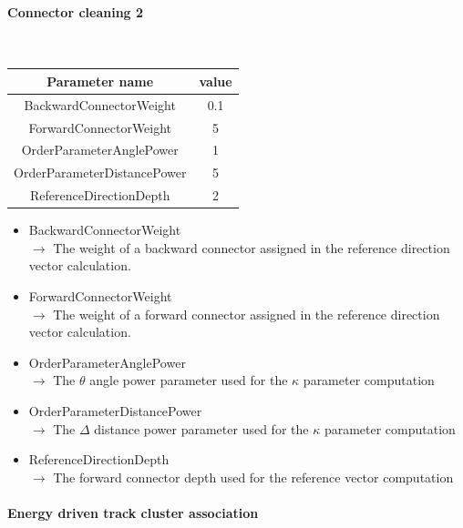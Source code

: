 \documentclass[cits]{JINST}
\begin{document}
\paragraph{Connector cleaning 2} ~

\begin{table}[!ht]
  \begin{center}
    \begin{tabu} to \linewidth { c | c } 
          Parameter name & value \\
          \hline
          BackwardConnectorWeight & 0.1 \\
          ForwardConnectorWeight & 5 \\
          OrderParameterAnglePower & 1 \\
          OrderParameterDistancePower & 5 \\
          ReferenceDirectionDepth & 2
    \end{tabu} 
  \end{center}
\end{table}

\begin{itemize}
  \item BackwardConnectorWeight \\
  $\rightarrow$ The weight of a backward connector assigned in the reference direction vector calculation.
  \item ForwardConnectorWeight \\
  $\rightarrow$ The weight of a forward connector assigned in the reference direction vector calculation.
  \item OrderParameterAnglePower \\
  $\rightarrow$ The $\theta$ angle power parameter used for the $\kappa$ parameter computation
  \item OrderParameterDistancePower \\
  $\rightarrow$ The $\Delta$ distance power parameter used for the $\kappa$ parameter computation
  \item ReferenceDirectionDepth \\
  $\rightarrow$ The forward connector depth used for the reference vector computation
\end{itemize}


\paragraph{Energy driven track cluster association} ~
\end{document}
